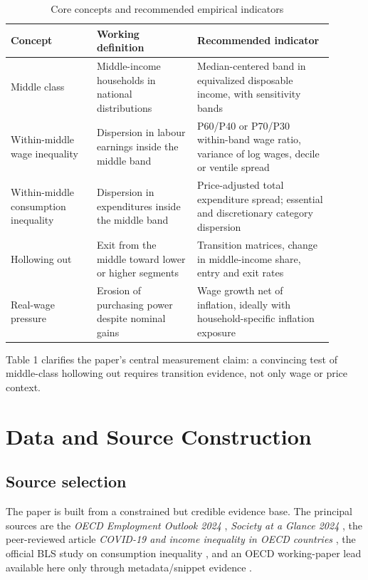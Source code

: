 \documentclass[11pt]{article}
\begin{document}
\begin{table}[t]
\centering
\caption{Core concepts and recommended empirical indicators}
\begin{tabular}{p{0.24\linewidth}p{0.28\linewidth}p{0.38\linewidth}}
\toprule
Concept & Working definition & Recommended indicator \\
\midrule
Middle class & Middle-income households in national distributions & Median-centered band in equivalized disposable income, with sensitivity bands \\
Within-middle wage inequality & Dispersion in labour earnings inside the middle band & P60/P40 or P70/P30 within-band wage ratio, variance of log wages, decile or ventile spread \\
Within-middle consumption inequality & Dispersion in expenditures inside the middle band & Price-adjusted total expenditure spread; essential and discretionary category dispersion \\
Hollowing out & Exit from the middle toward lower or higher segments & Transition matrices, change in middle-income share, entry and exit rates \\
Real-wage pressure & Erosion of purchasing power despite nominal gains & Wage growth net of inflation, ideally with household-specific inflation exposure \\
\bottomrule
\end{tabular}
\end{table}

\noindent Table 1 clarifies the paper's central measurement claim: a convincing test of middle-class hollowing out requires transition evidence, not only wage or price context.

\section{Data and Source Construction}

\subsection{Source selection}
The paper is built from a constrained but credible evidence base. The principal sources are the \emph{OECD Employment Outlook 2024} \citep{oecdemploymentoutl2024oecd}, \emph{Society at a Glance 2024} \citep{societyataglance202024bolletti}, the peer-reviewed article \emph{COVID-19 and income inequality in OECD countries} \citep{covid19andincomein2021springer}, the official BLS study on consumption inequality \citep{consumptioninequal2024bls}, and an OECD working-paper lead available here only through metadata/snippet evidence \citep{oecdeconomicsdepar2023one}.
\end{document}
